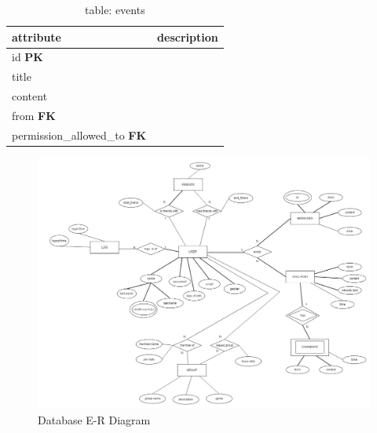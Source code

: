 \begin{table}[h]
    \centering
    \begin{tabular}{ll}
    attribute                           & description\\ \hline
    id \textbf{PK}                      & \\
    title                               & \\
    content                             & \\ 
    from \textbf{FK}                    & \\
    permission\_allowed\_to \textbf{FK} & \\
    \end{tabular}
    \caption{table: events}
\end{table}

\begin{figure}[h]
    \centering
    \includegraphics[width=\textwidth]{images/design/er_diagram.jpg}
    \caption{Database E-R Diagram}
    \label{fig:db_er_diag}
\end{figure}
